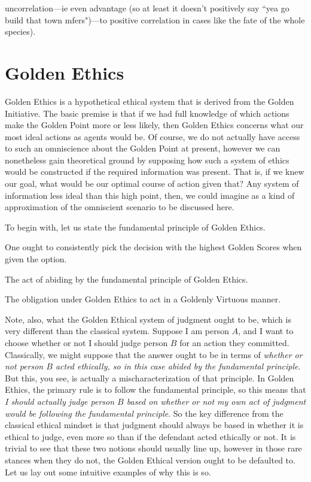 uncorrelation---ie even advantage (so at least it doesn't positively say ``yea go build that town mfers")---to positive correlation in cases like the fate of the whole species). 

\section{Golden Ethics}

Golden Ethics is a hypothetical ethical system that is derived from the Golden Initiative. The basic premise is that if we had full knowledge of which actions make the Golden Point more or less likely, then Golden Ethics concerns what our most ideal actions as agents would be. Of course, we do not actually have access to such an omniscience about the Golden Point at present, however we can nonetheless gain theoretical ground by supposing how such a system of ethics would be constructed if the required information was present. That is, if we knew our goal, what would be our optimal course of action given that? Any system of information less ideal than this high point, then, we could imagine as a kind of approximation of the omniscient scenario to be discussed here. 

To begin with, let us state the fundamental principle of Golden Ethics. 
\begin{prince}
    One ought to consistently pick the decision with the highest Golden Scores when given the option. 
\end{prince}
\begin{definition}
    The act of abiding by the fundamental principle of Golden Ethics. 
\end{definition}
\begin{definition}
    The obligation under Golden Ethics to act in a Goldenly Virtuous manner. 
\end{definition}
Note, also, what the Golden Ethical system of judgment ought to be, which is very different than the classical system. Suppose I am person $A$, and I want to choose whether or not I should judge person $B$ for an action they committed. Classically, we might suppose that the answer ought to be in terms of \textit{whether or not person $B$ acted ethically, so in this case abided by the fundamental principle}. But this, you see, is actually a mischaracterization of that principle. In Golden Ethics, the primary rule is to follow the fundamental principle, so this means that \textit{I should actually judge person $B$ based on whether or not my own act of judgment would be following the fundamental principle}. So the key difference from the classical ethical mindset is that judgment should always be based in whether it is ethical to judge, even more so than if the defendant acted ethically or not. It is trivial to see that these two notions should usually line up, however in those rare stances when they do not, the Golden Ethical version ought to be defaulted to. Let us lay out some intuitive examples of why this is so.

